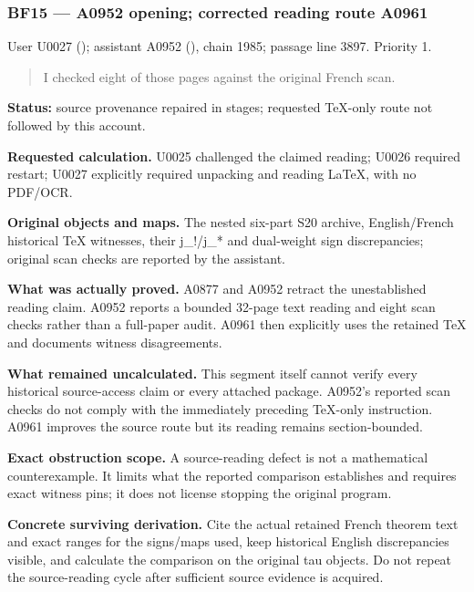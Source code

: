 \documentclass[10pt,a4paper,oneside]{report}
\begin{document}
\subsubsection{BF15 --- A0952 opening; corrected reading route
A0961}\label{bf15-a0952-opening-corrected-reading-route-a0961}

User U0027 (\protect{});
assistant A0952 (\protect{}),
chain 1985; passage line 3897. Priority 1.

\begin{quote}
I checked eight of those pages against the original French scan.
\end{quote}

\textbf{Status:} source provenance repaired in stages; requested
TeX-only route not followed by this account.

\textbf{Requested calculation.} U0025 challenged the claimed reading;
U0026 required restart; U0027 explicitly required unpacking and reading
LaTeX, with no PDF/OCR.

\textbf{Original objects and maps.} The nested six-part S20 archive,
English/French historical TeX witnesses, their j\_!/j\_* and dual-weight
sign discrepancies; original scan checks are reported by the assistant.

\textbf{What was actually proved.} A0877 and A0952 retract the
unestablished reading claim. A0952 reports a bounded 32-page text
reading and eight scan checks rather than a full-paper audit. A0961 then
explicitly uses the retained TeX and documents witness disagreements.

\textbf{What remained uncalculated.} This segment itself cannot verify
every historical source-access claim or every attached package. A0952's
reported scan checks do not comply with the immediately preceding
TeX-only instruction. A0961 improves the source route but its reading
remains section-bounded.

\textbf{Exact obstruction scope.} A source-reading defect is not a
mathematical counterexample. It limits what the reported comparison
establishes and requires exact witness pins; it does not license
stopping the original program.

\textbf{Concrete surviving derivation.} Cite the actual retained French
theorem text and exact ranges for the signs/maps used, keep historical
English discrepancies visible, and calculate the comparison on the
original tau objects. Do not repeat the source-reading cycle after
sufficient source evidence is acquired.
\end{document}
